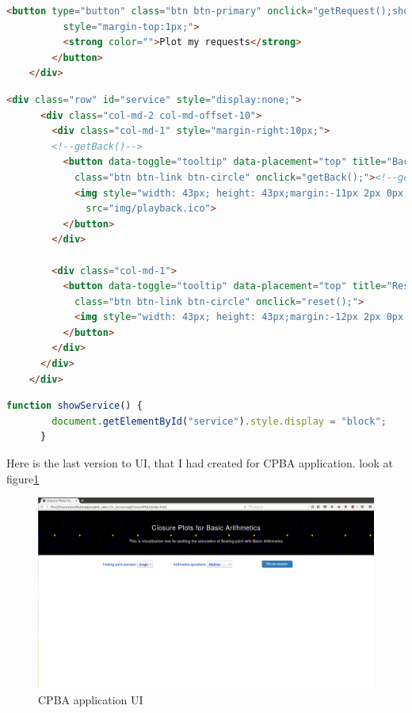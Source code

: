 \documentclass[11pt]{article}
\begin{document}
\begin{lstlisting}[label={lst:Plot my requests}, language=HTML, caption={Plot my requests button to get the value of the select option},]
        <button type="button" class="btn btn-primary" onclick="getRequest();showService();" 
          style="margin-top:1px;">
          <strong color="">Plot my requests</strong>
        </button>
	</div>      
\end{lstlisting}

\begin{lstlisting}[label={lst:select option button}, language=html, caption={Back and Reset buttons},]
    <div class="row" id="service" style="display:none;">
      <div class="col-md-2 col-md-offset-10">
        <div class="col-md-1" style="margin-right:10px;">
        <!--getBack()-->
          <button data-toggle="tooltip" data-placement="top" title="Back" type="button" 
            class="btn btn-link btn-circle" onclick="getBack();"><!--getBack-->
            <img style="width: 43px; height: 43px;margin:-11px 2px 0px -6px;" 
              src="img/playback.ico">
          </button>
        </div>

        <div class="col-md-1">
          <button data-toggle="tooltip" data-placement="top" title="Reset" type="button" 
            class="btn btn-link btn-circle" onclick="reset();">
            <img style="width: 43px; height: 43px;margin:-12px 2px 0px -7px;" src="img/reset.ico">
          </button>
        </div>
      </div>
    </div>
\end{lstlisting}

\begin{lstlisting}[label={lst:showService}, language=Javascript, caption={showService function will change style of buttons to block},]
      function showService() {
        document.getElementById("service").style.display = "block";
      }
\end{lstlisting}
Here is the last version to UI, that I had created for CPBA application. look at figure\ref{UI}
\begin{figure}[h]
    \centering
    \includegraphics[width=1\textwidth]{layout}
    \caption{CPBA application UI}
    \label{UI}
\end{figure}\\
\end{document}
